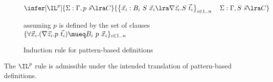 \begin{figure}[t]
\begin{equation*}
\infer[\IL^p]
{\Sigma : \Gamma, p\ \vec{s} \lra C}
{\left\{\vec{x}_i : B_i\ S\ \vec{x}_i \lra \nabla \vec{z}_i.S\
  \vec{t}_i\right\}_{i\in 1..n} \quad
  \Sigma : \Gamma, S\ \vec{s} \lra C}
\end{equation*}
\begin{center}
assuming $p$ is defined by the set of clauses $\{\forall \vec{x}_i.
(\nabla \vec{z}_i. p\ \vec{t}_i) \mueq B_i\ p\ \vec{x}_i\}_{i\in 1..n}$
\end{center}
\caption{Induction rule for pattern-based definitions}
\label{fig:pattern-induction-rule}
\end{figure}

\begin{theorem}
The $\IL^p$ rule is admissible under the intended translation of
pattern-based definitions.
\end{theorem}
